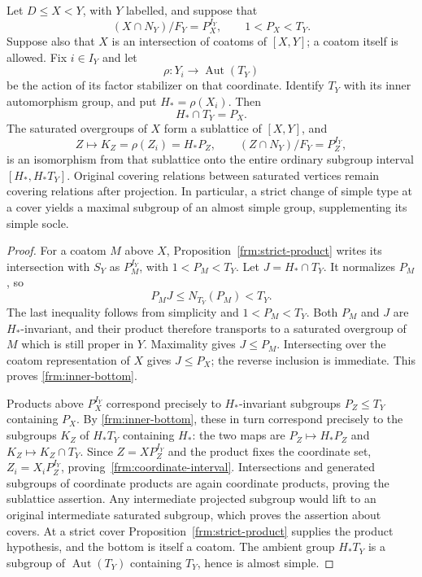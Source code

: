 \begin{proposition}
\label{frm:projection}
Let $D\le X<Y$, with $Y$ labelled, and suppose that
\[
 (X\cap N_Y)/F_Y=P_X^{I_Y},\qquad 1<P_X<T_Y.
\]
Suppose also that $X$ is an intersection of coatoms of $[X,Y]$;
a coatom itself is allowed. Fix $i\in I_Y$ and let
\[
 \rho:Y_i\longrightarrow\operatorname{Aut}(T_Y)
\]
be the action of its factor stabilizer on that coordinate. Identify
$T_Y$ with its inner automorphism group, and put
$H_* = \rho(X_i)$. Then
\begin{equation}
 \label{frm:inner-bottom}
 H_*\cap T_Y=P_X.
\end{equation}
The saturated overgroups of $X$ form a sublattice of $[X,Y]$, and
\begin{equation}
 \label{frm:coordinate-interval}
 Z\longmapsto K_Z=\rho(Z_i)=H_*P_Z,
 \qquad (Z\cap N_Y)/F_Y=P_Z^{I_Y},
\end{equation}
is an isomorphism from that sublattice onto the entire ordinary subgroup
interval $[H_*,H_*T_Y]$. Original covering relations between saturated
vertices remain covering relations after projection. In particular, a
strict change of simple type at a cover yields a maximal subgroup of an
almost simple group, supplementing its simple socle.
\end{proposition}

\begin{proof}
For a coatom $M$ above $X$, Proposition~\ref{frm:strict-product} writes
its intersection with $S_Y$ as $P_M^{I_Y}$, with $1<P_M<T_Y$.
Let $J=H_*\cap T_Y$. It normalizes $P_M$, so
\[
 P_MJ\le N_{T_Y}(P_M)<T_Y.
\]
The last inequality follows from simplicity and $1<P_M<T_Y$.
Both $P_M$ and $J$ are $H_*$-invariant, and their product therefore
transports to a saturated overgroup of $M$ which is still proper in $Y$.
Maximality gives $J\le P_M$. Intersecting over the coatom representation
of $X$ gives $J\le P_X$; the reverse inclusion is immediate. This proves
\eqref{frm:inner-bottom}.

Products above $P_X^{I_Y}$ correspond precisely to $H_*$-invariant
subgroups $P_Z\le T_Y$ containing $P_X$. By
\eqref{frm:inner-bottom}, these in turn correspond precisely to the
subgroups $K_Z$ of $H_*T_Y$ containing $H_*$: the two maps are
$P_Z\mapsto H_*P_Z$ and $K_Z\mapsto K_Z\cap T_Y$.
Since $Z=X P_Z^{I_Y}$ and the product fixes the coordinate set,
$Z_i=X_iP_Z^{I_Y}$, proving~\eqref{frm:coordinate-interval}.
Intersections and generated subgroups of coordinate products are again
coordinate products, proving the sublattice assertion. Any intermediate
projected subgroup would lift to an original intermediate saturated
subgroup, which proves the assertion about covers. At a strict cover
Proposition~\ref{frm:strict-product} supplies the product hypothesis,
and the bottom is itself a coatom. The ambient group $H_*T_Y$ is a
subgroup of $\operatorname{Aut}(T_Y)$ containing $T_Y$, hence is almost
simple.
\end{proof}

